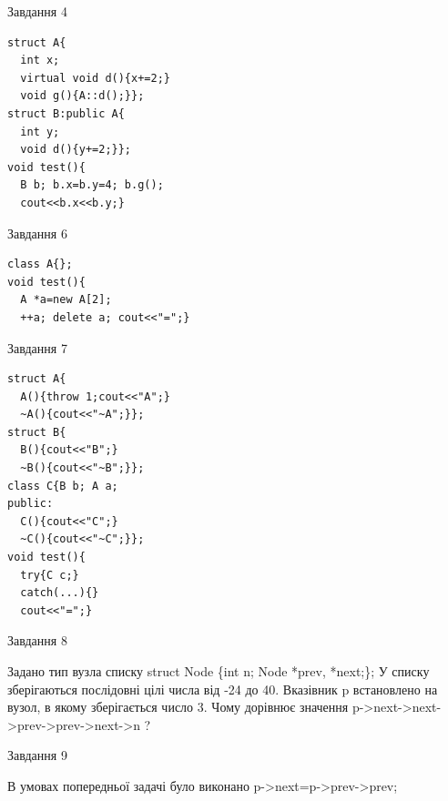 \documentclass[12pt, ukrainian]{article}
\begin{document}
{\begin{minipage}[t]{11cm}
\end{minipage}
\vline \hspace{8mm}
\begin{minipage}[t]{7cm}
               
{\begin{center}Завдання {4}\end{center}}
\vspace{-6mm}

\begin{verbatim}
struct A{
  int x;
  virtual void d(){x+=2;}
  void g(){A::d();}};
struct B:public A{
  int y;
  void d(){y+=2;}};
void test(){
  B b; b.x=b.y=4; b.g();
  cout<<b.x<<b.y;}
\end{verbatim}            


               
{\begin{center}Завдання {6}\end{center}}
\vspace{-6mm}

\begin{verbatim}
class A{};
void test(){
  A *a=new A[2]; 
  ++a; delete a; cout<<"=";} 
\end{verbatim}            


               
{\begin{center}Завдання {7}\end{center}}
\vspace{-6mm}

\begin{verbatim}
struct A{
  A(){throw 1;cout<<"A";}
  ~A(){cout<<"~A";}};
struct B{
  B(){cout<<"B";}
  ~B(){cout<<"~B";}};
class C{B b; A a;
public:
  C(){cout<<"C";}
  ~C(){cout<<"~C";}};
void test(){
  try{C c;} 
  catch(...){} 
  cout<<"=";}
\end{verbatim}            


\end{minipage}
               
{\begin{center}Завдання {8}\end{center}}
\vspace{-6mm}
Задано тип вузла списку
struct Node \{int n; Node *prev, *next;\};
У списку зберігаються послідовні цілі числа від -24 до 40. Вказівник p встановлено на вузол, в якому зберігається число 3.
Чому дорівнює значення p->next->next->prev->prev->next->n ?\par

               
{\begin{center}Завдання {9}\end{center}}
\vspace{-6mm}
В умовах попередньої задачі було виконано p->next=p->prev->prev;

}
\end{document}
